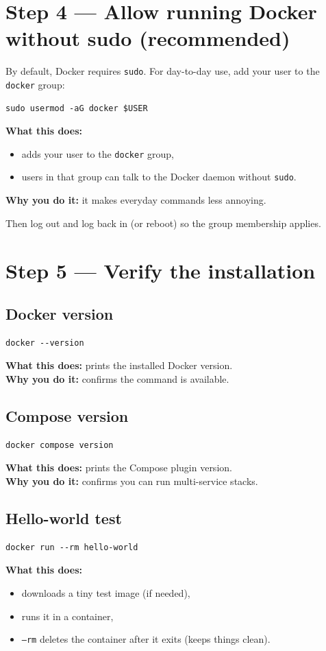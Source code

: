 \section{Step 4 --- Allow running Docker without sudo (recommended)}
By default, Docker requires \texttt{sudo}. For day-to-day use, add your user to the \texttt{docker} group:

\begin{lstlisting}
sudo usermod -aG docker $USER
\end{lstlisting}

\textbf{What this does:}
\begin{itemize}[leftmargin=*]
  \item adds your user to the \texttt{docker} group,
  \item users in that group can talk to the Docker daemon without \texttt{sudo}.
\end{itemize}

\textbf{Why you do it:} it makes everyday commands less annoying.

Then log out and log back in (or reboot) so the group membership applies.

\section{Step 5 --- Verify the installation}
\subsection{Docker version}
\begin{lstlisting}
docker --version
\end{lstlisting}
\textbf{What this does:} prints the installed Docker version. \\
\textbf{Why you do it:} confirms the command is available.

\subsection{Compose version}
\begin{lstlisting}
docker compose version
\end{lstlisting}
\textbf{What this does:} prints the Compose plugin version. \\
\textbf{Why you do it:} confirms you can run multi-service stacks.

\subsection{Hello-world test}
\begin{lstlisting}
docker run --rm hello-world
\end{lstlisting}
\textbf{What this does:}
\begin{itemize}[leftmargin=*]
  \item downloads a tiny test image (if needed),
  \item runs it in a container,
  \item \texttt{--rm} deletes the container after it exits (keeps things clean).
\end{itemize}

